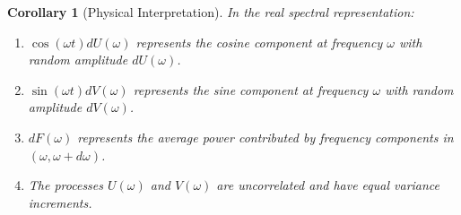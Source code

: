\documentclass{article}
\newtheorem{corollary}{Corollary}
{\theorembodyfont{\rmfamily}\newtheorem{remark}{Remark}}
\begin{document}
\begin{corollary}
  [Physical Interpretation] In the real spectral representation:
  \begin{enumerate}
    \item $\cos (\omega t) dU (\omega)$ represents the cosine component at
    frequency $\omega$ with random amplitude $dU (\omega)$.
    
    \item $\sin (\omega t) dV (\omega)$ represents the sine component at
    frequency $\omega$ with random amplitude $dV (\omega)$.
    
    \item $dF (\omega)$ represents the average power contributed by frequency
    components in $(\omega, \omega + d \omega)$.
    
    \item The processes $U (\omega)$ and $V (\omega)$ are uncorrelated and
    have equal variance increments.
  \end{enumerate}
\end{corollary}

\
\end{document}
